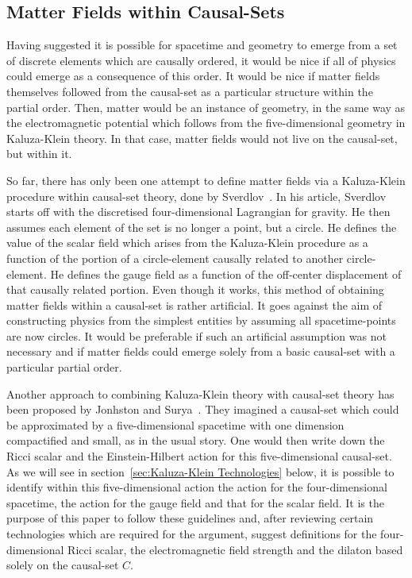 \documentclass[a4paper,12pt]{article}
\numberwithin{equation}{section}
\begin{document}
\subsection{Matter Fields within Causal-Sets}
\label{sec:Matter Fields within Causal-Sets}

Having suggested it is possible for spacetime and geometry to emerge from a set of discrete elements which are causally ordered, it would be nice if all of physics could emerge as a consequence of this order. It would be nice if matter fields themselves followed from the causal-set as a particular structure within the partial order. Then, matter would be an instance of geometry, in the same way as the electromagnetic potential which follows from the five-dimensional geometry in Kaluza-Klein theory. In that case, matter fields would not live on the causal-set, but within it.

So far, there has only been one attempt to define matter fields via a Kaluza-Klein procedure within causal-set theory, done by Sverdlov~\cite{Sverdlov2008b}. In his article, Sverdlov starts off with the discretised four-dimensional Lagrangian for gravity. He then assumes each element of the set is no longer a point, but a circle. He defines the value of the scalar field which arises from the Kaluza-Klein procedure as a function of the portion of a circle-element causally related to another circle-element. He defines the gauge field as a function of the off-center displacement of that causally related portion. Even though it works, this method of obtaining matter fields within a causal-set is rather artificial. It goes against the aim of constructing physics from the simplest entities by assuming all spacetime-points are now circles. It would be preferable if such an artificial assumption was not necessary and if matter fields could emerge solely from a basic causal-set with a particular partial order.

Another approach to combining Kaluza-Klein theory with causal-set theory has been proposed by Jonhston and Surya~\cite{Johnston2010}. They imagined a causal-set which could be approximated by a five-dimensional spacetime with one dimension compactified and small, as in the usual story. One would then write down the Ricci scalar and the Einstein-Hilbert action for this five-dimensional causal-set. As we will see in section~\ref{sec:Kaluza-Klein Technologies} below, it is possible to identify within this five-dimensional action the action for the four-dimensional spacetime, the action for the gauge field and that for the scalar field. It is the purpose of this paper to follow these guidelines and, after reviewing certain technologies which are required for the argument, suggest definitions for the four-dimensional Ricci scalar, the electromagnetic field strength and the dilaton based solely on the causal-set $C$.
\end{document}
